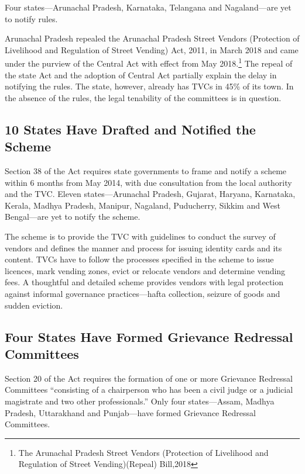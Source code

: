 \documentclass[a4paper, 12pt, twoside]{article}
\begin{document}
{	Four states—Arunachal Pradesh, Karnataka, Telangana and Nagaland—are yet to notify rules.

	Arunachal Pradesh repealed the Arunachal Pradesh Street Vendors (Protection of Livelihood and Regulation of Street Vending) Act, 2011, in March 2018 and came under the purview of the Central Act with effect from May 2018.\footnote{The Arunachal Pradesh Street Vendors (Protection of Livelihood and Regulation of Street Vending)(Repeal) Bill,2018} The repeal of the state Act and the adoption of Central Act partially explain the delay in notifying the rules. The state, however, already has TVCs in 45\% of its town. In the absence of the rules, the legal tenability of the committees is in question.

\subsection*{10 States Have Drafted and Notified the Scheme}
	Section 38 of the Act requires state governments to frame and notify a scheme within 6 months from May 2014, with due consultation from the local authority and the TVC. Eleven states—Arunachal Pradesh, Gujarat, Haryana, Karnataka, Kerala, Madhya Pradesh, Manipur, Nagaland, Puducherry, Sikkim and West Bengal—are yet to notify the scheme.

	The scheme is to provide the TVC with guidelines to conduct the survey of vendors and defines the manner and process for issuing identity cards and its content. TVCs have to follow the processes specified in the scheme to issue licences, mark vending zones, evict or relocate vendors and determine vending fees. A thoughtful and detailed scheme provides vendors with legal protection against informal governance practices—hafta collection, seizure of goods and sudden eviction.

\subsection*{Four States Have Formed Grievance Redressal Committees}
	Section 20 of the Act requires the formation of one or more Grievance Redressal Committees “consisting of a chairperson who has been a civil judge or a judicial magistrate and two other professionals.” Only four states—Assam, Madhya Pradesh, Uttarakhand and Punjab—have formed Grievance Redressal Committees.

}
\end{document}
